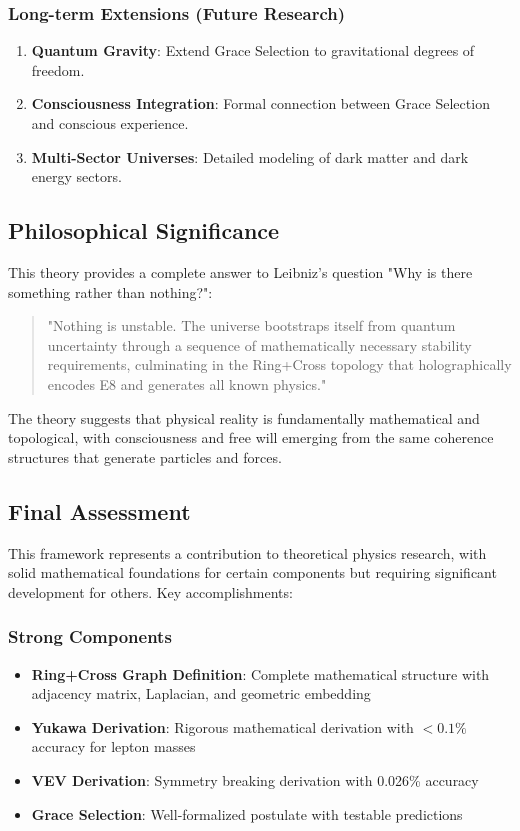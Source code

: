 \documentclass[12pt,a4paper]{article}
\begin{document}
\begin{itemize}
\begin{itemize}
\subsubsection{Long-term Extensions (Future Research)}
\begin{enumerate}
\item \textbf{Quantum Gravity}: Extend Grace Selection to gravitational degrees of freedom.

\item \textbf{Consciousness Integration}: Formal connection between Grace Selection and conscious experience.

\item \textbf{Multi-Sector Universes}: Detailed modeling of dark matter and dark energy sectors.
\end{enumerate}

\subsection{Philosophical Significance}

This theory provides a complete answer to Leibniz's question "Why is there something rather than nothing?":

\begin{quote}
"Nothing is unstable. The universe bootstraps itself from quantum uncertainty through a sequence of mathematically necessary stability requirements, culminating in the Ring+Cross topology that holographically encodes E8 and generates all known physics."
\end{quote}

The theory suggests that physical reality is fundamentally mathematical and topological, with consciousness and free will emerging from the same coherence structures that generate particles and forces.

\subsection{Final Assessment}

This framework represents a contribution to theoretical physics research, with solid mathematical foundations for certain components but requiring significant development for others. Key accomplishments:

\subsubsection{Strong Components}
\begin{itemize}
\item \textbf{Ring+Cross Graph Definition}: Complete mathematical structure with adjacency matrix, Laplacian, and geometric embedding
\item \textbf{Yukawa Derivation}: Rigorous mathematical derivation with $<0.1\%$ accuracy for lepton masses
\item \textbf{VEV Derivation}: Symmetry breaking derivation with 0.026\% accuracy
\item \textbf{Grace Selection}: Well-formalized postulate with testable predictions
\end{itemize}


\end{itemize}
\end{itemize}
\end{document}
